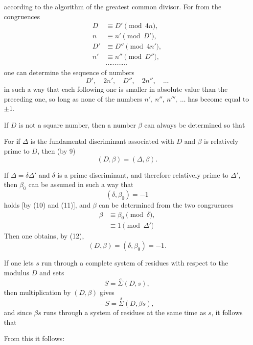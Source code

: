 according to the algorithm of the greatest common divisor. For from the congruences
\[
\begin{aligned}
D &\equiv D' \pmod{4n}, \\
n &\equiv n' \pmod{D'}, \\
D' &\equiv D'' \pmod{4n'}, \\
n' &\equiv n'' \pmod{D''}, \\
&\cdots\cdots\cdots\cdots
\end{aligned}
\]
one can determine the sequence of numbers
\[
D', \quad 2n', \quad D'', \quad 2n'', \quad \dots
\]
in such a way that each following one is smaller in absolute value than the preceding one, so long as none of the numbers $n'$, $n''$, $n'''$, $\dots$ has become equal to $\pm 1$.

If $D$ is not a square number, then a number $\beta$ can always be determined so that

For if $\varDelta$ is the fundamental discriminant associated with $D$ and $\beta$ is relatively prime to $D$, then (by 9)
\[
(D, \beta) = (\varDelta, \beta).
\]

If $\varDelta = \delta \varDelta'$ and $\delta$ is a prime discriminant, and therefore relatively prime to $\varDelta'$, then $\beta_0$ can be assumed in such a way that
\[
(\delta, \beta_0) = -1
\]
holds [by (10) and (11)], and $\beta$ can be determined from the two congruences
\[
\begin{aligned}
\beta &\equiv \beta_0 \pmod{\delta}, \\
&\equiv 1 \pmod{\varDelta'}
\end{aligned}
\]
Then one obtains, by (12),
\[
(D, \beta) = (\delta, \beta_0) = -1.
\]

If one lets $s$ run through a complete system of residues with respect to the modulus $D$ and sets
\[
S = \overset{s}{\Sigma}(D, s), %
\]
then multiplication by $(D, \beta)$ gives
\[
-S = \overset{s}{\Sigma}(D, \beta s),
\]
and since $\beta s$ runs through a system of residues at the same time as $s$, it follows that

From this it follows:
